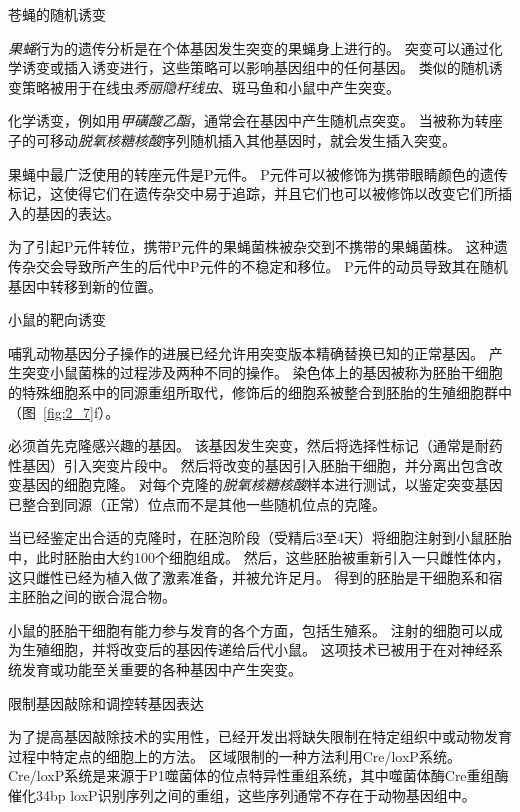 \begin{proposition}[在实验动物中产生突变] \label{box:2_2}
	
	\quad \quad 苍蝇的随机诱变
	
	\quad \quad \textit{果蝇}行为的遗传分析是在个体基因发生突变的果蝇身上进行的。
	突变可以通过化学诱变或插入诱变进行，这些策略可以影响基因组中的任何基因。
	类似的随机诱变策略被用于在线虫\textit{秀丽隐杆线虫}、斑马鱼和小鼠中产生突变。
	
	\quad \quad 化学诱变，例如用\textit{甲磺酸乙酯}，通常会在基因中产生随机点突变。
	当被称为转座子的可移动\textit{脱氧核糖核酸}序列随机插入其他基因时，就会发生插入突变。
	
	\quad \quad 果蝇中最广泛使用的转座元件是P元件。
	P元件可以被修饰为携带眼睛颜色的遗传标记，这使得它们在遗传杂交中易于追踪，并且它们也可以被修饰以改变它们所插入的基因的表达。
	
	\quad \quad 为了引起P元件转位，携带P元件的果蝇菌株被杂交到不携带的果蝇菌株。
	这种遗传杂交会导致所产生的后代中P元件的不稳定和移位。
	P元件的动员导致其在随机基因中转移到新的位置。
	
	\quad \quad 小鼠的靶向诱变
	
	\quad \quad 哺乳动物基因分子操作的进展已经允许用突变版本精确替换已知的正常基因。
	产生突变小鼠菌株的过程涉及两种不同的操作。
	染色体上的基因被称为胚胎干细胞的特殊细胞系中的同源重组所取代，修饰后的细胞系被整合到胚胎的生殖细胞群中（图~\ref{fig:2_7}f）。
	
	\quad \quad 必须首先克隆感兴趣的基因。
	该基因发生突变，然后将选择性标记（通常是耐药性基因）引入突变片段中。
	然后将改变的基因引入胚胎干细胞，并分离出包含改变基因的细胞克隆。
	对每个克隆的\textit{脱氧核糖核酸}样本进行测试，以鉴定突变基因已整合到同源（正常）位点而不是其他一些随机位点的克隆。
	
	\quad \quad 当已经鉴定出合适的克隆时，在胚泡阶段（受精后3至4天）将细胞注射到小鼠胚胎中，此时胚胎由大约100个细胞组成。
	然后，这些胚胎被重新引入一只雌性体内，这只雌性已经为植入做了激素准备，并被允许足月。
	得到的胚胎是干细胞系和宿主胚胎之间的嵌合混合物。
	
	\quad \quad 小鼠的胚胎干细胞有能力参与发育的各个方面，包括生殖系。
	注射的细胞可以成为生殖细胞，并将改变后的基因传递给后代小鼠。
	这项技术已被用于在对神经系统发育或功能至关重要的各种基因中产生突变。
	
	\quad \quad 限制基因敲除和调控转基因表达
	
	\quad \quad 为了提高基因敲除技术的实用性，已经开发出将缺失限制在特定组织中或动物发育过程中特定点的细胞上的方法。
	区域限制的一种方法利用Cre/loxP系统。
	Cre/loxP系统是来源于P1噬菌体的位点特异性重组系统，其中噬菌体酶Cre重组酶催化34bp loxP识别序列之间的重组，这些序列通常不存在于动物基因组中。
	

\end{proposition}
